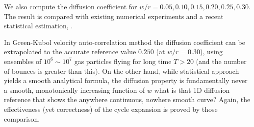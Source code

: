 We also compute the diffusion coefficient for $w/r = 0.05, 0.10, 0.15,
0.20, 0.25, 0.30$. The result is compared with existing 
numerical experiments and a recent statistical estimation, 
.

In Green-Kubol velocity auto-correlation method the  diffusion
coefficient can be extrapolated to the accurate reference value
$0.250$ (at $w/r=0.30$), using ensembles of $10^6\sim10^7$ gas
particles flying for long time $T>20$ (and the number of bounces is
greater than this). On the other hand, while statistical
approach yields a smooth analytical formula, the
diffusion property is fundamentally never a smooth, monotonically
increasing function of $w$  {what is that 1D diffusion
reference that shows the anywhere continuous, nowhere smooth curve?}
Again, the effectiveness (yet correctness) of the cycle expansion is
proved by those comparison.
